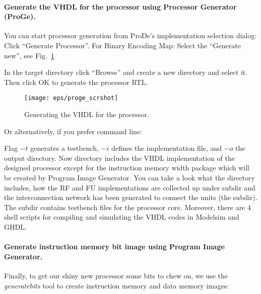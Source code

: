 \documentclass[twoside]{tceusermanual}
\begin{document}
\paragraph{Generate the VHDL for the processor using Processor Generator
(ProGe).}

You can start processor generation from ProDe's implementation selection dialog:
Click ``Generate Processor''. For Binary Encoding Map: Select the
``Generate new'', see Fig.~\ref{fig:proge} 

In the target directory click ``Browse'' and create a new
directory  and select it. Then click OK to generate the
processor RTL.

\begin{figure}
  \begin{center} \texttt{[image: eps/proge\_scrshot]}
  \caption{Generating the VHDL for the processor.}
  \label{fig:proge} \end{center}
\end{figure}


Or alternatively, if you prefer command line:


Flag $-t$ generates a testbench, $-i$ defines the implementation file,
and $-o$ the output directory.  Now directory 
includes the VHDL implementation of the designed processor except for
the instruction memory width package which will be created by Program
Image Generator. You can take a look what the directory includes, how
the RF and FU implementations are collected up under
 subdir and the interconnection network has been generated to
connect the units (the  subdir). The  subdir
contains testbench files for the processor core. Moreover, there are 4
shell scripts for compiling and simulating the VHDL codes in Modelsim
and GHDL.

\paragraph{Generate instruction memory bit image using Program Image Generator.}

Finally, to get our shiny new processor some bits to chew on,
we use the \textit{generatebits} tool to create instruction memory and data
memory images:

\end{document}
